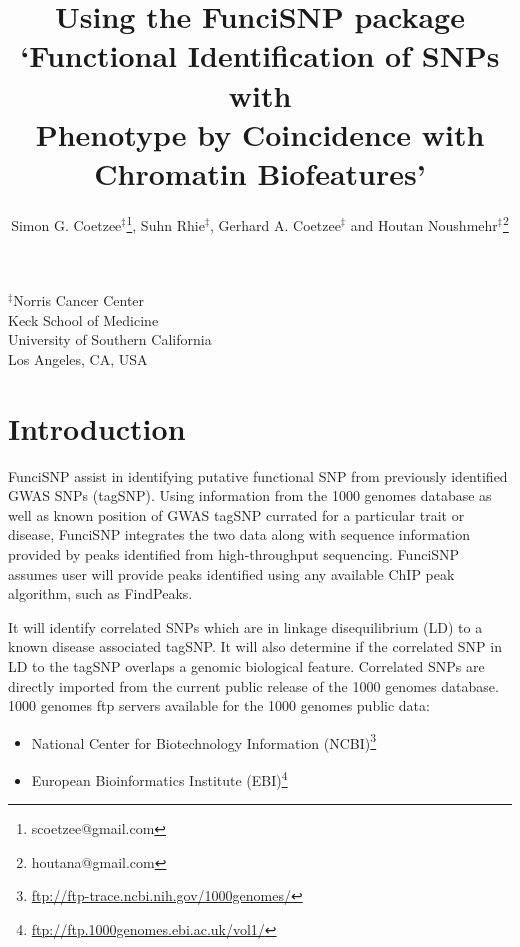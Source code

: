 \documentclass[12pt,fullpage]{article}
\author{Simon G. Coetzee$^\ddagger$\footnote{scoetzee@gmail.com}, Suhn
Rhie$^\ddagger$, Gerhard A. Coetzee$^\ddagger$ and Houtan
Noushmehr$^\ddagger$\footnote{houtana@gmail.com}}
\begin{document}
\title{Using the FunciSNP package\\`Functional Identification of SNPs with\\
Phenotype by Coincidence with Chromatin Biofeatures'}
\maketitle

\begin{center}$^\ddagger$Norris Cancer Center\\Keck School of
Medicine\\University of Southern California\\Los Angeles, CA,
USA
\end{center}
\tableofcontents
\section{Introduction}

FunciSNP assist in identifying putative functional SNP from previously
identified GWAS SNPs (tagSNP). Using information from the 1000 genomes database
as well as known position of GWAS tagSNP currated for a particular trait or
disease, FunciSNP integrates the two data along with sequence information
provided by peaks identified from high-throughput sequencing. FunciSNP assumes
user will provide peaks identified using any available ChIP peak algorithm, such
as FindPeaks.

It will identify correlated SNPs which are in linkage disequilibrium (LD) to a
known disease associated tagSNP. It will also determine if the correlated SNP in
LD to the tagSNP overlaps a genomic biological feature. Correlated SNPs are
directly imported from the current public release of the 1000 genomes database.
1000 genomes ftp servers available for the 1000 genomes public data: 

\begin{itemize}
\item National Center for Biotechnology Information
(NCBI)\footnote{\url{ftp://ftp-trace.ncbi.nih.gov/1000genomes/}}
\item European Bioinformatics Institute
(EBI)\footnote{\url{ftp://ftp.1000genomes.ebi.ac.uk/vol1/}}
\end{itemize}
\end{document}
